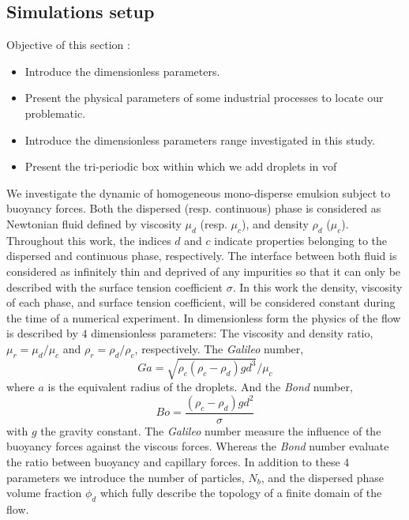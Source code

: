 

\subsection{Simulations setup}
Objective of this section :
\begin{itemize}
    \item Introduce the dimensionless parameters.
    \item Present the physical parameters of some industrial processes to locate our problematic. 
    \item Introduce the dimensionless parameters range investigated in this study.
    \item Present the tri-periodic box within which we add droplets in vof 
\end{itemize}
We investigate the dynamic of homogeneous mono-disperse emulsion subject to buoyancy forces. 
Both the dispersed (resp. continuous) phase is considered as Newtonian fluid defined by viscosity $\mu_d$ (resp. $\mu_c$), and density $\rho_d$ ($\mu_c$).
Throughout this work, the indices $d$ and $c$ indicate properties belonging to the dispersed and continuous phase, respectively. 
The interface between both fluid is considered as infinitely thin and deprived of any impurities so that it can only be described with the surface tension coefficient $\sigma$. 
In this work the density, viscosity of each phase, and surface tension coefficient, will be considered constant during  the time of a numerical experiment.
In dimensionless form the physics of the flow is described by $4$ dimensionless parameters: 
The viscosity and density ratio, $\mu_r = \mu_d / \mu_c$ and $\rho_r = \rho_d / \rho_c$, respectively. 
The \textit{Galileo} number, 
\begin{equation*}
    Ga =\sqrt{\rho_c(\rho_c - \rho_d) g d^3} / \mu_c
\end{equation*}
where $a$ is the equivalent radius of the droplets.
And the \textit{Bond} number, 
\begin{equation*}
    Bo =\frac{(\rho_c - \rho_d) g d^2}{\sigma}
\end{equation*}
with $g$ the gravity constant. 
The \textit{Galileo} number measure the influence of the buoyancy forces against the viscous forces.
Whereas the \textit{Bond} number evaluate the ratio between buoyancy and capillary forces. 
In addition to these $4$ parameters we introduce the number of particles, $N_b$, and the dispersed phase volume fraction $\phi_d$ which fully describe the topology of a finite domain of the flow. 


